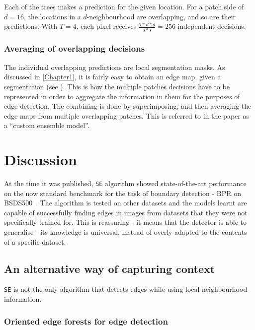 Each of the trees makes a prediction for the given location. For a patch side of $d = 16$, the locations in a $d$-neighbourhood are overlapping, and so are their predictions. With $T=4$, each pixel receives $\frac{T*d*d}{s*s}=256$ independent decisions.


\subsubsection{Averaging of overlapping decisions}
The individual overlapping predictions %
are local segmentation masks. As discussed in \cref{Chapter1}, it is fairly easy to obtain an edge map, given a segmentation (see ). This is how the multiple patches decisions have to be represented in order to aggregate the information in them for the purposes of edge detection. The combining is done by superimposing, %
and then averaging the edge maps from multiple overlapping patches. %
This is referred to in the paper \cite{DollarICCV13edges} as a ``custom ensemble model''.

\section{Discussion}
At the time it was published, {\tt SE} algorithm showed state-of-the-art performance on the now standard benchmark for the task of boundary detection - BPR on BSDS500~\cite{Arbelaez11}. The algorithm is tested on other datasets and the models learnt are capable of successfully finding edges in images from datasets that they were not specifically trained for. This is reassuring - it means that the detector is able to generalise - its knowledge is universal, instead of overly adapted to %
the contents of a specific dataset.

\subsection{An alternative way of capturing context}
\label{sec:ch2-alternative-capturing-context}
{\tt SE} is not the only algorithm that detects edges while using local neighbourhood information.

\subsubsection{Oriented edge forests for edge detection}
